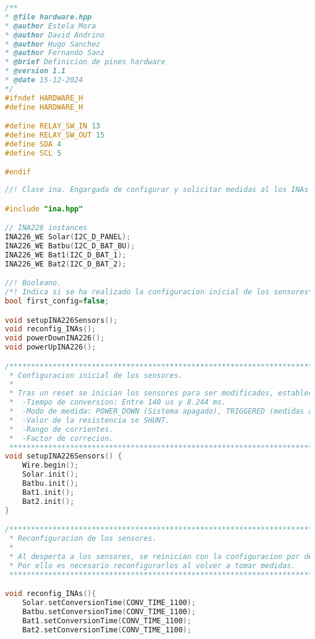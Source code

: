 \begin{lstlisting}[language=c++,caption={Fichero\texttt{hardware.hpp}}, captionpos=b]
/**
* @file hardware.hpp
* @author Estela Mora
* @author David Andrino
* @author Hugo Sanchez
* @author Fernando Sanz
* @brief Definicion de pines hardware
* @version 1.1
* @date 15-12-2024
*/
#ifndef HARDWARE_H
#define HARDWARE_H

#define RELAY_SW_IN 13
#define RELAY_SW_OUT 15
#define SDA 4
#define SCL 5

#endif
\end{lstlisting}

\begin{lstlisting}[language=c++,caption={Fichero\texttt{ina.cpp}}, captionpos=b]
//! Clase ina. Engargada de configurar y solicitar medidas al los INAs del circuito.

#include "ina.hpp"

// INA226 instances
INA226_WE Solar(I2C_D_PANEL);
INA226_WE Batbu(I2C_D_BAT_BU);
INA226_WE Bat1(I2C_D_BAT_1);
INA226_WE Bat2(I2C_D_BAT_2);

//! Booleano.
/*! Indica si se ha realizado la configuracion inicial de los sensores*/
bool first_config=false;

void setupINA226Sensors();
void reconfig_INAs();
void powerDownINA226();
void powerUpINA226();

/**************************************************************************//**
 * Configuracion inicial de los sensores.
 *
 * Tras un reset se inician los sensores para ser modificados, estableciendose los parametros:
 *  -Tiempo de conversion: Entre 140 us y 8.244 ms.
 *  -Modo de medida: POWER_DOWN (Sistema apagado), TRIGGERED (medidas a peticion) o CONTINUOUS (medidas constantes).
 *  -Valor de la resistencia se SHUNT. 
 *  -Rango de corrientes.
 *  -Factor de correcion.
 ******************************************************************************/
void setupINA226Sensors() {
    Wire.begin();
    Solar.init();
    Batbu.init();
    Bat1.init();
    Bat2.init();
}

/**************************************************************************//**
 * Reconfiguracion de los sensores.
 *
 * Al desperta a los sensores, se reinician con la configuracion por defecto.
 * Por ello es necesario reconfigurarlos al volver a tomar medidas.
 ******************************************************************************/

void reconfig_INAs(){
    Solar.setConversionTime(CONV_TIME_1100);
    Batbu.setConversionTime(CONV_TIME_1100);
    Bat1.setConversionTime(CONV_TIME_1100);
    Bat2.setConversionTime(CONV_TIME_1100);


\end{lstlisting}
